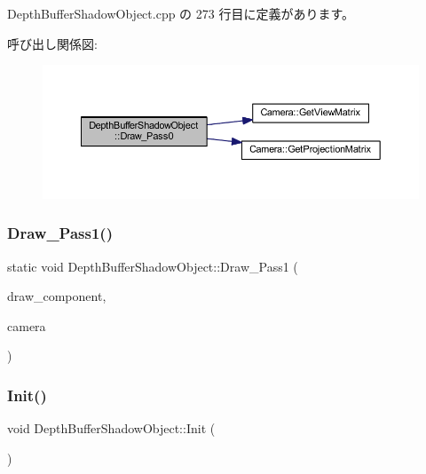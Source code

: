  Depth\+Buffer\+Shadow\+Object.\+cpp の 273 行目に定義があります。

呼び出し関係図\+:\nopagebreak
\begin{figure}[H]
\begin{center}
\leavevmode
\includegraphics[width=350pt]{class_depth_buffer_shadow_object_a7916c03b90a01c71a9050e721cf6810c_cgraph}
\end{center}
\end{figure}
\mbox{\label{class_depth_buffer_shadow_object_a4bf8a72a447aa6ff150f3fef630ab448}} 
\subsubsection{\texorpdfstring{Draw\+\_\+\+Pass1()}{Draw\_Pass1()}}
{\footnotesize\ttfamily static void Depth\+Buffer\+Shadow\+Object\+::\+Draw\+\_\+\+Pass1 (\begin{DoxyParamCaption}\item[{Draw\+Component $\ast$}]{draw\+\_\+component,  }\item[{\mbox{\hyperlink{class_camera}{Camera}} $\ast$}]{camera }\end{DoxyParamCaption})\hspace{0.3cm}{\ttfamily [static]}}

\mbox{\label{class_depth_buffer_shadow_object_a03e23f51e5e68babc7a1a42d0fedfba0}} 
\subsubsection{\texorpdfstring{Init()}{Init()}}
{\footnotesize\ttfamily void Depth\+Buffer\+Shadow\+Object\+::\+Init (\begin{DoxyParamCaption}{ }\end{DoxyParamCaption})\hspace{0.3cm}{\ttfamily [static]}}



